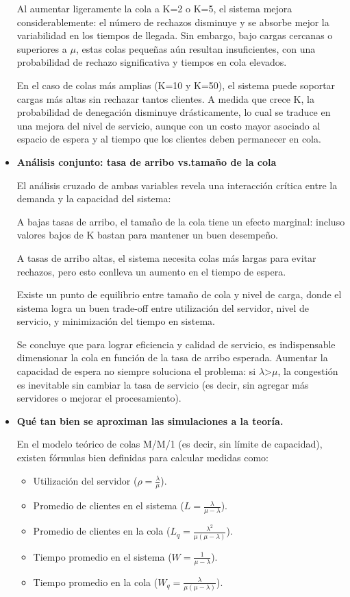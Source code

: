 \documentclass[12pt]{article}
\begin{document}
\begin{itemize}
    Al aumentar ligeramente la cola a K=2 o K=5, el sistema mejora considerablemente: el número de rechazos disminuye y se absorbe mejor la variabilidad en los tiempos de llegada. Sin embargo, bajo cargas cercanas o superiores a  \(\mu\), estas colas pequeñas aún resultan insuficientes, con una probabilidad de rechazo significativa y tiempos en cola elevados.

    En el caso de colas más amplias (K=10 y K=50), el sistema puede soportar cargas más altas sin rechazar tantos clientes. A medida que crece K, la probabilidad de denegación disminuye drásticamente, lo cual se traduce en una mejora del nivel de servicio, aunque con un costo mayor asociado al espacio de espera y al tiempo que los clientes deben permanecer en cola.
    \item \textbf{Análisis conjunto: tasa de arribo vs.tamaño de la cola}\par
    El análisis cruzado de ambas variables revela una interacción crítica entre la demanda y la capacidad del sistema:

    A bajas tasas de arribo, el tamaño de la cola tiene un efecto marginal: incluso valores bajos de K bastan para mantener un buen desempeño.

    A tasas de arribo altas, el sistema necesita colas más largas para evitar rechazos, pero esto conlleva un aumento en el tiempo de espera.

    Existe un punto de equilibrio entre tamaño de cola y nivel de carga, donde el sistema logra un buen trade-off entre utilización del servidor, nivel de servicio, y minimización del tiempo en sistema.

    Se concluye que para lograr eficiencia y calidad de servicio, es indispensable dimensionar la cola en función de la tasa de arribo esperada. Aumentar la capacidad de espera no siempre soluciona el problema: si \(\lambda\)>\(\mu\), la congestión es inevitable sin cambiar la tasa de servicio (es decir, sin agregar más servidores o mejorar el procesamiento).
    \item \textbf{Qué tan bien se aproximan las simulaciones a la teoría.}\par
    En el modelo teórico de colas M/M/1 (es decir, sin límite de capacidad), existen fórmulas bien definidas para calcular medidas como:
    \begin{itemize}
        \item Utilización del servidor ($\rho = \frac{\lambda}{\mu}$).
        \item Promedio de clientes en el sistema ($L = \frac{\lambda}{\mu - \lambda}$).
        \item Promedio de clientes en la cola ($L_q = \frac{\lambda^2}{\mu(\mu - \lambda)}$).
        \item Tiempo promedio en el sistema ($W = \frac{1}{\mu - \lambda}$).
        \item Tiempo promedio en la cola ($W_q = \frac{\lambda}{\mu(\mu - \lambda)}$).
    \end{itemize}


\end{itemize}
\end{document}
